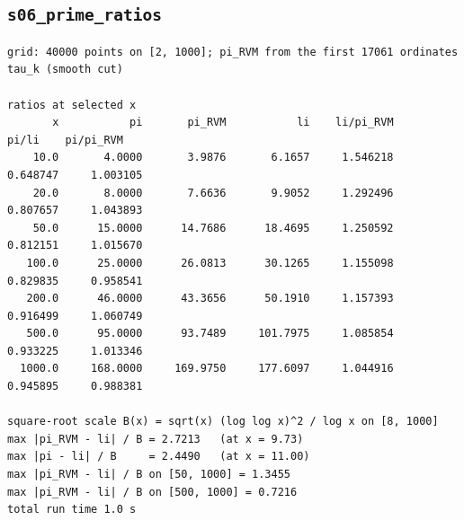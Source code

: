 \documentclass[11pt,reqno]{amsart}
\numberwithin{equation}{section}
\theoremstyle{plain}
\theoremstyle{definition}
\theoremstyle{remark}
\begin{document}
\subsection{\texttt{s06\_prime\_ratios}}
\label{app:out-s06-prime-ratios}

\begin{lstlisting}[style=out]
grid: 40000 points on [2, 1000]; pi_RVM from the first 17061 ordinates tau_k (smooth cut)

ratios at selected x
       x           pi       pi_RVM           li    li/pi_RVM        pi/li    pi/pi_RVM
    10.0       4.0000       3.9876       6.1657     1.546218     0.648747     1.003105
    20.0       8.0000       7.6636       9.9052     1.292496     0.807657     1.043893
    50.0      15.0000      14.7686      18.4695     1.250592     0.812151     1.015670
   100.0      25.0000      26.0813      30.1265     1.155098     0.829835     0.958541
   200.0      46.0000      43.3656      50.1910     1.157393     0.916499     1.060749
   500.0      95.0000      93.7489     101.7975     1.085854     0.933225     1.013346
  1000.0     168.0000     169.9750     177.6097     1.044916     0.945895     0.988381

square-root scale B(x) = sqrt(x) (log log x)^2 / log x on [8, 1000]
max |pi_RVM - li| / B = 2.7213   (at x = 9.73)
max |pi - li| / B     = 2.4490   (at x = 11.00)
max |pi_RVM - li| / B on [50, 1000] = 1.3455
max |pi_RVM - li| / B on [500, 1000] = 0.7216
total run time 1.0 s
\end{lstlisting}
\end{document}

